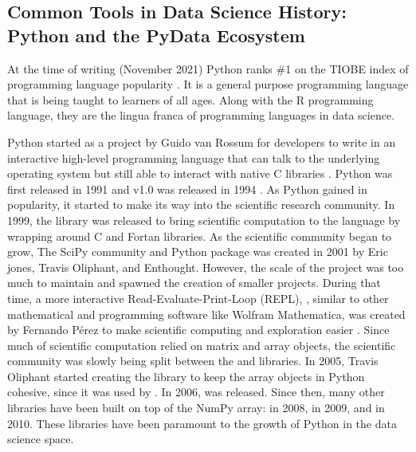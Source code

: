 \documentclass[010-intro.tex]{subfiles}
\begin{document}
    \subsection{Common Tools in Data Science History: Python and the PyData Ecosystem}
    
        At the time of writing (November 2021) Python ranks \#1 on the TIOBE index
        of programming language popularity
        \cite{IndexTIOBESoftware}.
        It is a general purpose programming language that is being taught to learners of all ages.
        Along with the R programming language, they are the lingua franca of programming languages in data science.

        Python started as a project by Guido van Rossum for developers
        to write in an interactive high-level programming language that can
        talk to the underlying operating system but still able to interact with native C libraries
        \cite{severanceGuidoVanRossum2005}.
        Python was first released in 1991 and v1.0 was released in 1994
        \cite{severanceGuidoVanRossum2005}.
        As Python gained in popularity,
        it started to make its way into the scientific research community.
        In 1999, the  library was released to bring scientific computation to the language
        by wrapping around C and Fortan libraries.
        As the scientific community began to grow,
        The SciPy community and Python package was created in 2001 by Eric jones, Travis Oliphant, and Enthought.
        However, the scale of the  project was too much to maintain
        and spawned the creation of smaller  projects.
        During that time,
        a more interactive Read-Evaluate-Print-Loop (REPL),
        ,
        similar to other mathematical and programming software like Wolfram Mathematica,
        was created by Fernando Pérez to make scientific computing and exploration easier
        \cite{iPythondevelopmentteamHistory}.
        Since much of scientific computation relied on matrix and array objects,
        the scientific community was slowly being split between the  and  libraries.
        In 2005, Travis Oliphant started creating the  library to keep the array objects in Python cohesive,
        since it was used by .
        In 2006,  was released.
        Since then, many other libraries have been built on top of the NumPy array:
         in 2008,  in 2009, and  in 2010.
        These libraries have been paramount to the growth of Python in the data science space. %
\end{document}
